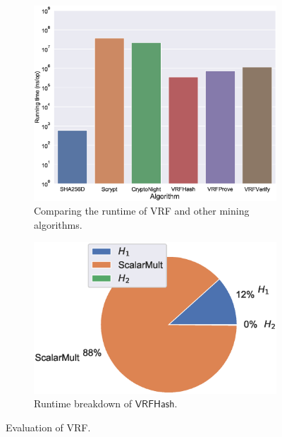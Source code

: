 \begin{figure}[htbp]
    \centering
    \begin{subfigure}[]{0.45\textwidth}
        \centering
        \includegraphics[width=\linewidth]{figs/runtime-comparison.eps}
        \caption{Comparing the runtime of VRF and other mining algorithms.}
        \label{fig:runtime-comparison}
    \end{subfigure}
    \hfill
    \begin{subfigure}[]{0.45\textwidth}
        \centering
        \includegraphics[width=\linewidth]{figs/runtime-breakdown.eps}
        \caption{Runtime breakdown of $\mathsf{VRFHash}$.}
        \label{fig:runtime-breakdown}
    \end{subfigure}
    \caption{Evaluation of VRF.}
\end{figure}

